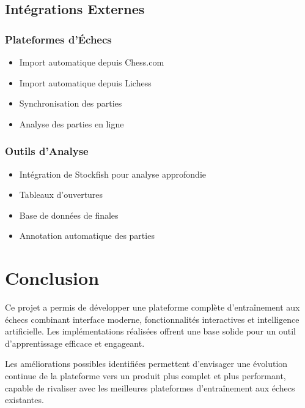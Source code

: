 \documentclass[a4paper,12pt]{article}
\begin{document}
\subsection{Intégrations Externes}

\subsubsection{Plateformes d'Échecs}
\begin{itemize}
    \item Import automatique depuis Chess.com
    \item Import automatique depuis Lichess
    \item Synchronisation des parties
    \item Analyse des parties en ligne
\end{itemize}

\subsubsection{Outils d'Analyse}
\begin{itemize}
    \item Intégration de Stockfish pour analyse approfondie
    \item Tableaux d'ouvertures
    \item Base de données de finales
    \item Annotation automatique des parties
\end{itemize}

\section{Conclusion}

Ce projet a permis de développer une plateforme complète d'entraînement aux échecs combinant interface moderne, fonctionnalités interactives et intelligence artificielle. Les implémentations réalisées offrent une base solide pour un outil d'apprentissage efficace et engageant.

Les améliorations possibles identifiées permettent d'envisager une évolution continue de la plateforme vers un produit plus complet et plus performant, capable de rivaliser avec les meilleures plateformes d'entraînement aux échecs existantes.
\end{document}
